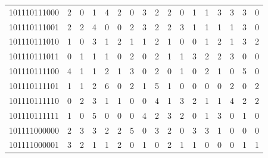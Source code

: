 \documentclass[10pt,a4paper]{article}
\begin{document}
\begin{longtable}{ |c|c|c|c|c|c|c|c|c|c|c|c|c|c|c|c|c| }
    101110111000              & 2                            & 0                                & 1                            & 4                              & 2   & 0   & 3   & 2   & 2   & 0   & 1   & 1   & 3   & 3   & 3   & 0   \\
    101110111001              & 2                            & 2                                & 4                            & 0                              & 0   & 2   & 3   & 2   & 2   & 3   & 1   & 1   & 1   & 1   & 3   & 0   \\
    101110111010              & 1                            & 0                                & 3                            & 1                              & 2   & 1   & 1   & 2   & 1   & 0   & 0   & 1   & 2   & 1   & 3   & 2   \\
    101110111011              & 0                            & 1                                & 1                            & 1                              & 0   & 2   & 0   & 2   & 1   & 1   & 3   & 2   & 2   & 3   & 0   & 0   \\
    101110111100              & 4                            & 1                                & 1                            & 2                              & 1   & 3   & 0   & 2   & 0   & 1   & 0   & 2   & 1   & 0   & 5   & 0   \\
    101110111101              & 1                            & 1                                & 2                            & 6                              & 0   & 2   & 1   & 5   & 1   & 0   & 0   & 0   & 0   & 2   & 0   & 2   \\
    101110111110              & 0                            & 2                                & 3                            & 1                              & 1   & 0   & 0   & 4   & 1   & 3   & 2   & 1   & 1   & 4   & 2   & 2   \\
    101110111111              & 1                            & 0                                & 5                            & 0                              & 0   & 0   & 4   & 2   & 3   & 2   & 0   & 1   & 3   & 0   & 1   & 0   \\
    101111000000              & 2                            & 3                                & 3                            & 2                              & 2   & 5   & 0   & 3   & 2   & 0   & 3   & 3   & 1   & 0   & 0   & 0   \\
    101111000001              & 3                            & 2                                & 1                            & 1                              & 2   & 0   & 1   & 0   & 2   & 1   & 1   & 0   & 0   & 0   & 1   & 1   \\

\end{longtable}
\end{document}
